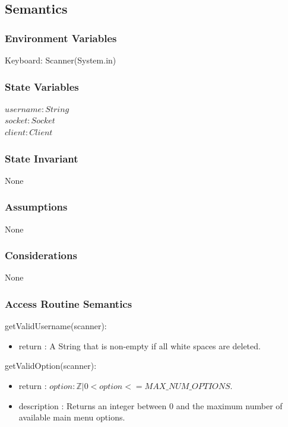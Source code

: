 \documentclass[12pt, titlepage]{article}
\begin{document}
    \subsection* {Semantics}
    
    \subsubsection* {Environment Variables}
        Keyboard: Scanner(System.in)
        
    \subsubsection* {State Variables}
        $\mathit{username}: String$\\
        $\mathit{socket}: Socket$\\
        $\mathit{client} : Client$\\
    
    \subsubsection* {State Invariant}
        None
    
    \subsubsection* {Assumptions}
        None
    
    \subsubsection* {Considerations}
        None
    
    \subsubsection* {Access Routine Semantics}
    
        \noindent getValidUsername(scanner):
        \begin{itemize}
        \item return : A String that is non-empty if all white spaces are deleted.
        \end{itemize}
        
        \noindent getValidOption(scanner):
        \begin{itemize}
        \item return : $option : \mathbb{Z} | 0 < option <= MAX\_NUM\_OPTIONS$.
        \item description : Returns an integer between 0 and the maximum number of available main menu options.
        \end{itemize}
        
\end{document}

